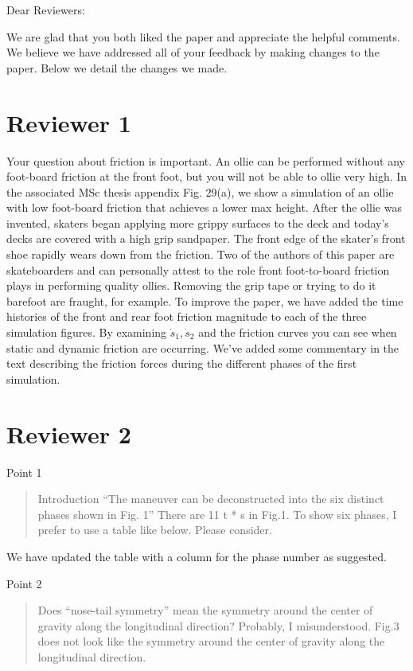 \documentclass{letter}
\begin{document}
\begin{letter}{}
\opening{Dear Reviewers:}

We are glad that you both liked the paper and appreciate the helpful comments. We believe we have addressed all of your feedback by making changes to the paper. Below we detail the changes we made.

\section{Reviewer 1}

Your question about friction is important. An ollie can be performed without any foot-board friction at the front foot, but you will not be able to ollie very high. In the associated MSc thesis appendix Fig. 29(a), we show a simulation of an ollie with low foot-board friction that achieves a lower max height. After the ollie was invented, skaters began applying more grippy surfaces to the deck and today's decks are covered with a high grip sandpaper. The front edge of the skater's front shoe rapidly wears down from the friction. Two of the authors of this paper are skateboarders and can personally attest to the role front foot-to-board friction plays in performing quality ollies. Removing the grip tape or trying to do it barefoot are fraught, for example. To improve the paper, we have added the time histories of the front and rear foot friction magnitude to each of the three simulation figures. By examining \(\dot{s}_1,\dot{s}_2\) and the friction curves you can see when static and dynamic friction are occurring. We've added some commentary in the text describing the friction forces during the different phases of the first simulation.

\section{Reviewer 2}

Point 1

\begin{quote}
    Introduction ``The maneuver can be deconstructed into the six distinct phases shown in Fig. 1'' There are 11 t * s in Fig.1. To show six phases, I prefer to use a table like below. Please consider.
\end{quote}

We have updated the table with a column for the phase number as suggested.

Point 2

\begin{quote}
    Does ``nose-tail symmetry'' mean the symmetry around the center of gravity along the longitudinal direction? Probably, I misunderstood. Fig.3 does not look like the symmetry around the center of gravity along the longitudinal direction.
\end{quote}


\end{letter}
\end{document}
